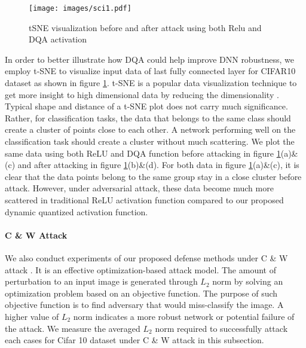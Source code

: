 \documentclass{article}
\begin{document}
\begin{figure}[ht]
  \centering
   \texttt{[image: images/sci1.pdf]}
   \caption{tSNE visualization before and after attack using both Relu and DQA activation}
   \label{tsne}
\end{figure}


In order to better illustrate how DQA could help improve DNN robustness, we employ t-SNE to visualize input data of last fully connected layer for CIFAR10 dataset as shown in figure \ref{tsne}. t-SNE is a popular data visualization technique to get more insight to high dimensional data by reducing the dimensionality \cite{maaten2008visualizing}. Typical shape and distance of a t-SNE plot does not carry much significance. Rather, for classification tasks, the data that belongs to the same class should create a cluster of points close to each other. A network performing well on the classification task should create a cluster without much scattering. We plot the same data using both ReLU and DQA function before attacking in figure \ref{tsne}(a)\&(c) and after attacking in figure \ref{tsne}(b)\&(d). For both data in figure \ref{tsne}(a)\&(c), it is clear that the data points belong to the same group stay in a close cluster before attack. However, under adversarial attack, these data become much more scattered in traditional ReLU activation function compared to our proposed dynamic quantized activation function.

\paragraph{C \& W Attack}
 

We also conduct experiments of our proposed defense methods under C \& W attack \cite{carlini2017towards}. It is an effective optimization-based attack model. The amount of perturbation to an input image is generated through $L_2$ norm by solving an optimization problem based on an objective function. The purpose of such objective function is to find adversary that would miss-classify the image. A higher value of $L_2$ norm indicates a more robust network or potential failure of the attack. 
We measure the averaged $L_2$ norm required to successfully attack each cases for Cifar 10 dataset under C \& W attack in this subsection.
\end{document}
